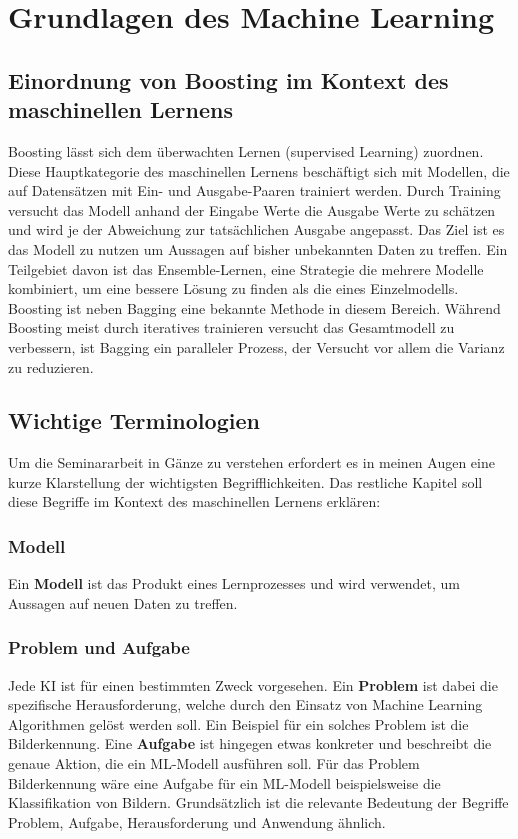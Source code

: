 \section{Grundlagen des Machine Learning}
\subsection{Einordnung von Boosting im Kontext des maschinellen Lernens}
Boosting lässt sich dem überwachten Lernen (supervised Learning) zuordnen. Diese Hauptkategorie des maschinellen Lernens beschäftigt sich mit Modellen, die auf Datensätzen mit Ein- und Ausgabe-Paaren trainiert werden. Durch Training versucht das Modell anhand der Eingabe Werte die Ausgabe Werte zu schätzen und wird je der Abweichung zur tatsächlichen Ausgabe angepasst. Das Ziel ist es das Modell zu nutzen um Aussagen auf bisher unbekannten Daten zu treffen.
\newline
Ein Teilgebiet davon ist das Ensemble-Lernen, eine Strategie die mehrere Modelle kombiniert, um eine bessere Lösung zu finden als die eines Einzelmodells. Boosting ist neben Bagging eine bekannte Methode in diesem Bereich. Während Boosting meist durch iteratives trainieren versucht das Gesamtmodell zu verbessern, ist Bagging ein paralleler Prozess, der Versucht vor allem die Varianz zu reduzieren.

\subsection{Wichtige Terminologien}
Um die Seminararbeit in Gänze zu verstehen erfordert es in meinen Augen eine kurze Klarstellung der wichtigsten Begrifflichkeiten. Das restliche Kapitel soll diese Begriffe im Kontext des maschinellen Lernens erklären:

\subsubsection{Modell}
Ein \textbf{Modell} ist das Produkt eines Lernprozesses und wird verwendet, um Aussagen auf neuen Daten zu treffen.

\subsubsection{Problem und Aufgabe}
Jede KI ist für einen bestimmten Zweck vorgesehen. Ein \textbf{Problem} ist dabei die spezifische Herausforderung, welche durch den Einsatz von Machine Learning Algorithmen gelöst werden soll. Ein Beispiel für ein solches Problem ist  die Bilderkennung. Eine \textbf{Aufgabe} ist hingegen etwas konkreter und beschreibt die genaue Aktion, die ein ML-Modell ausführen soll. Für das Problem Bilderkennung wäre eine Aufgabe für ein ML-Modell beispielsweise die Klassifikation von Bildern. Grundsätzlich ist die relevante Bedeutung der Begriffe Problem, Aufgabe, Herausforderung und Anwendung ähnlich.


